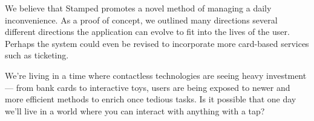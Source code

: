 We believe that Stamped promotes a novel method of managing a daily inconvenience. As a proof of concept, we outlined many directions several different directions the application can evolve to fit into the lives of the user. Perhaps the system could even be revised to incorporate more card-based services such as ticketing.

We're living in a time where contactless technologies are seeing heavy investment --- from bank cards to interactive toys, users are being exposed to newer and more efficient methods to enrich once tedious tasks. Is it possible that one day we'll live in a world where you can interact with anything with a tap? 